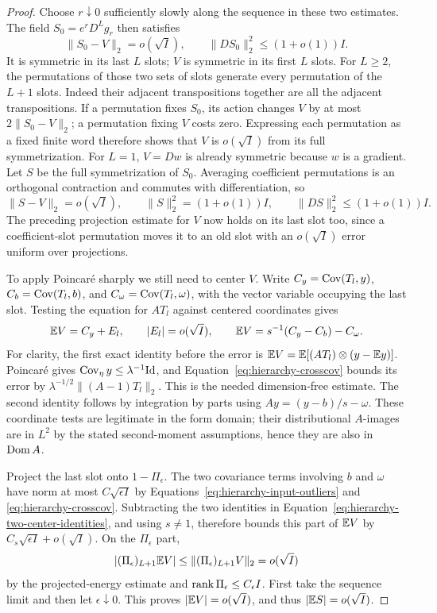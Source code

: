 \begin{proof}
Choose $r\downarrow0$ sufficiently slowly along the sequence in these
two estimates.  The field $S_0=e^rD^Lg_r$ then satisfies
\[
 \|S_0-V\|_2=o(\sqrt I),\qquad
 \|DS_0\|_2^2\le(1+o(1))I.
\]
It is symmetric in its last $L$ slots; $V$ is symmetric in its first
$L$ slots.  For $L\ge2$, the permutations of those two sets of slots
generate every permutation of the $L+1$ slots.  Indeed their adjacent
transpositions together are all the adjacent transpositions.  If a
permutation fixes $S_0$, its action changes $V$ by at most
$2\|S_0-V\|_2$; a permutation fixing $V$ costs zero.  Expressing each
permutation as a fixed finite word therefore shows that $V$ is
$o(\sqrt I)$ from its full symmetrization.  For $L=1$, $V=Dw$ is
already symmetric because $w$ is a gradient.  Let $S$ be the full
symmetrization of $S_0$.  Averaging coefficient permutations is an
orthogonal contraction and commutes with differentiation, so
\begin{equation}\label{eq:hierarchy-symmetric-approximant}
 \|S-V\|_2=o(\sqrt I),\qquad
 \|S\|_2^2=(1+o(1))I,\qquad
 \|DS\|_2^2\le(1+o(1))I.
\end{equation}
The preceding projection estimate for $V$ now holds on its last slot
too, since a coefficient-slot permutation moves it to an old slot with
an $o(\sqrt I)$ error uniform over projections.

To apply Poincar\'e sharply we still need to center $V$.  Write
$C_y=\operatorname{Cov}(T_l,y)$, $C_b=\operatorname{Cov}(T_l,b)$, and
$C_\omega=\operatorname{Cov}(T_l,\omega)$, with the vector variable occupying the
last slot.  Testing the equation for $AT_l$ against centered coordinates
gives
\begin{equation}\label{eq:hierarchy-two-center-identities}
 \mathbb E V=C_y+E_l,\qquad |E_l|=o(\sqrt I),\qquad
 \mathbb E V=s^{-1}(C_y-C_b)-C_\omega.
\end{equation}
For clarity, the first exact identity before the error is
$\mathbb E V=\mathbb E[(AT_l)\otimes(y-\mathbb E y)]$.  Poincar\'e gives
$\operatorname{Cov}_\eta y\le\lambda^{-1}\mathrm{Id}$, and
Equation~\eqref{eq:hierarchy-crosscov} bounds its error by
$\lambda^{-1/2}\|(A-1)T_l\|_2$.  This is the needed dimension-free
estimate.  The second identity follows by integration by parts using
$Ay=(y-b)/s-\omega$.  These coordinate tests are legitimate in the
form domain; their distributional $A$-images are in $L^2$ by the stated
second-moment assumptions, hence they are also in $\operatorname{Dom} A$.

Project the last slot onto $1-\Pi_\epsilon$.  The two covariance terms
involving $b$ and $\omega$ have norm at most $C\sqrt{\epsilon I}$ by
Equations~\eqref{eq:hierarchy-input-outliers} and
\eqref{eq:hierarchy-crosscov}.  Subtracting the two identities in
Equation~\eqref{eq:hierarchy-two-center-identities}, and using $s\ne1$,
therefore bounds this part of $\mathbb E V$ by
$C_s\sqrt{\epsilon I}+o(\sqrt I)$.  On the $\Pi_\epsilon$ part,
\[
 |(\Pi_\epsilon)_{L+1}\mathbb E V|
 \le\|(\Pi_\epsilon)_{L+1}V\|_2=o(\sqrt I)
\]
by the projected-energy estimate and $\operatorname{rank}\Pi_\epsilon\le C_\epsilon I$.
First take the sequence limit and then let $\epsilon\downarrow0$.
This proves $|\mathbb E V|=o(\sqrt I)$, and thus $|\mathbb E S|=o(\sqrt I)$.


\end{proof}
